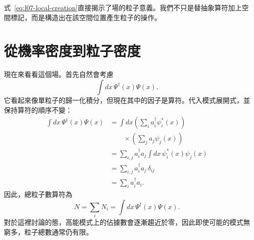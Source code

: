 \begin{classroomqa}
\end{classroomqa}

式~\eqref{eq:l07-local-creation}直接揭示了場的粒子意義。我們不只是替抽象算符加上空間標記，而是構造出在該空間位置產生粒子的操作。

\begin{classroomqa}
\end{classroomqa}

\begin{classroomqa}
\end{classroomqa}

\section{從機率密度到粒子密度}

現在來看看這個場。首先自然會考慮
\begin{equation}
\int dx\,\Psi^\dagger(x)\Psi(x).
\end{equation}
它看起來像單粒子的歸一化積分，但現在其中的因子是算符。代入模式展開式，並保持算符的順序不變：
\begin{align}
\int dx\,\Psi^\dagger(x)\Psi(x)
&=\int dx
\left(\sum_i a_i^\dagger\psi_i^*(x)\right)\\
&\qquad\times\left(\sum_j a_j\psi_j(x)\right) \\
&=\sum_{i,j}a_i^\dagger a_j
\int dx\,\psi_i^*(x)\psi_j(x) \\
&=\sum_{i,j}a_i^\dagger a_j\,\delta_{ij} \\
&=\sum_i a_i^\dagger a_i.
\label{eq:l07-number-derivation}
\end{align}
因此，總粒子數算符為
\begin{equation}
N=\sum_i N_i
=\int dx\,\Psi^\dagger(x)\Psi(x).
\label{eq:l07-total-number}
\end{equation}
對於這裡討論的態，高能模式上的佔據數會逐漸趨近於零，因此即使可能的模式無窮多，粒子總數通常仍有限。

